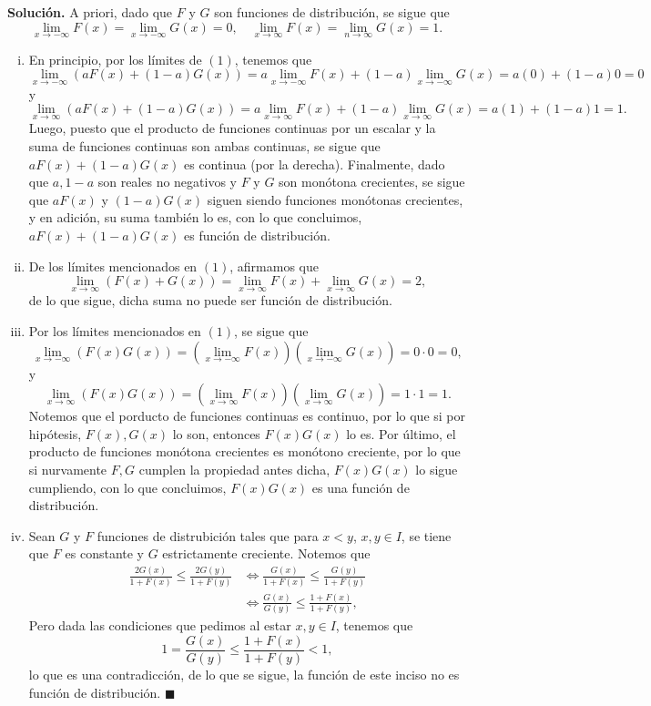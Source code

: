 \documentclass[11pt]{scrartcl}
\begin{document}
\textbf{Solución.} A priori, dado que $F$ y $G$ son funciones de distribución, se sigue que
    \begin{equation*}
        \lim_{x\to -\infty}F(x)=\lim_{x\to -\infty}G(x)=0, \quad \lim_{x\to \infty}F(x)=\lim_{n\to \infty}G(x)=1. \tag{1}
    \end{equation*}
\begin{enumerate}[(i)]
    \item En principio, por los límites de $(1)$, tenemos que
    \[
    \lim_{x\to -\infty}\left(aF(x)+(1-a)G(x)\right) = a\lim_{x\to -\infty}F(x) + (1-a)\lim_{x\to -\infty}G(x) = a(0) + (1-a)0 = 0
    \]
    y
    \[
    \lim_{x\to \infty}\left(aF(x)+(1-a)G(x)\right) = a\lim_{x\to \infty}F(x) + (1-a)\lim_{x\to \infty}G(x) = a(1) + (1-a)1 = 1.
    \]
    Luego, puesto que el producto de funciones continuas por un escalar y la suma de funciones continuas son ambas continuas, se sigue que
    $aF(x)+(1-a)G(x)$ es continua (por la derecha). Finalmente, dado que $a,1-a$ son reales no negativos y $F$ y $G$ son monótona crecientes,
    se sigue que $aF(x)$ y $(1-a)G(x)$ siguen siendo funciones monótonas crecientes, y en adición, su suma también lo es, con lo que concluimos,
    $aF(x)+(1-a)G(x)$ es función de distribución.
    \item De los límites mencionados en $(1)$, afirmamos que
    \[
    \lim_{x\to \infty}(F(x)+G(x)) = \lim_{x\to \infty}F(x) + \lim_{x\to \infty}G(x) = 2,
    \]
    de lo que sigue, dicha suma no puede ser función de distribución.
    \item Por los límites mencionados en $(1)$, se sigue que
    \[
    \lim_{x\to -\infty}\left(F(x)G(x)\right) = \left(\lim_{x\to -\infty}F(x)\right)\left(\lim_{x\to -\infty}G(x)\right) = 0\cdot 0=0,
    \]
    y
    \[
    \lim_{x\to \infty}\left(F(x)G(x)\right) = \left(\lim_{x\to \infty}F(x)\right)\left(\lim_{x\to \infty}G(x)\right) = 1\cdot 1=1.
    \]
    Notemos que el porducto de funciones continuas es continuo, por lo que si por hipótesis, $F(x),G(x)$ lo son, entonces $F(x)G(x)$ lo es. Por último,
    el producto de funciones monótona crecientes es monótono creciente, por lo que si nurvamente $F,G$ cumplen la propiedad antes dicha, $F(x)G(x)$ lo sigue cumpliendo,
    con lo que concluimos, $F(x)G(x)$ es una función de distribución.
    \item Sean $G$ y $F$ funciones de distrubición tales que para $x<y$, $x,y \in I$, se tiene que $F$ es constante y $G$ estrictamente creciente. Notemos que
    \begin{align*}
        \frac{2G(x)}{1+F(x)} \leq \frac{2G(y)}{1+F(y)} &\iff \frac{G(x)}{1+F(x)} \leq \frac{G(y)}{1+F(y)} \\
        &\iff \frac{G(x)}{G(y)} \leq \frac{1+F(x)}{1+F(y)},
    \end{align*}
    Pero dada las condiciones que pedimos al estar $x,y \in I$, tenemos que
    \[
    1=\frac{G(x)}{G(y)} \leq \frac{1+F(x)}{1+F(y)} < 1,
    \]
    lo que es una contradicción, de lo que se sigue, la función de este inciso no es función de distribución. $\blacksquare$
\end{enumerate}
\end{document}
